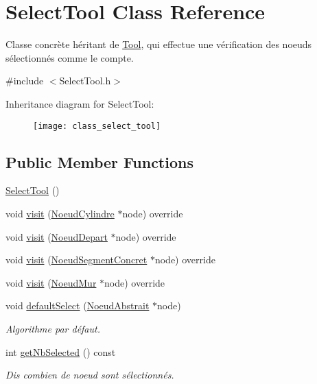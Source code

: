 \hypertarget{class_select_tool}{}\section{Select\+Tool Class Reference}
\label{class_select_tool}


Classe concrète héritant de \hyperlink{class_tool}{Tool}, qui effectue une vérification des noeuds sélectionnés comme le compte.  




{\ttfamily \#include $<$Select\+Tool.\+h$>$}

Inheritance diagram for Select\+Tool\+:\begin{figure}[H]
\begin{center}
\leavevmode
\texttt{[image: class\_select\_tool]}
\end{center}
\end{figure}
\subsection*{Public Member Functions}
\begin{DoxyCompactItemize}
\item 
\hyperlink{group__inf2990_ga2174af55e744036f0ccc5ce1fe25ddb1}{Select\+Tool} ()
\item 
void \hyperlink{group__inf2990_gacd9fee116b738725ab0f664029253fa0}{visit} (\hyperlink{class_noeud_cylindre}{Noeud\+Cylindre} $\ast$node) override
\item 
void \hyperlink{group__inf2990_ga392f7eb2a74106cff675878f5453a9d3}{visit} (\hyperlink{class_noeud_depart}{Noeud\+Depart} $\ast$node) override
\item 
void \hyperlink{group__inf2990_ga3e4db43bef245d0d88d49f018fee424f}{visit} (\hyperlink{class_noeud_segment_concret}{Noeud\+Segment\+Concret} $\ast$node) override
\item 
void \hyperlink{group__inf2990_gab6a7d46d8fad7c1045678b6dec3c9400}{visit} (\hyperlink{class_noeud_mur}{Noeud\+Mur} $\ast$node) override
\item 
void \hyperlink{group__inf2990_ga01b8ec1322baa74ee48e5087337bc959}{default\+Select} (\hyperlink{class_noeud_abstrait}{Noeud\+Abstrait} $\ast$node)
\begin{DoxyCompactList}\small\item\em Algorithme par défaut. \end{DoxyCompactList}\item 
int \hyperlink{group__inf2990_gaca4f60cc972b5d9df612f48c18c8364a}{get\+Nb\+Selected} () const 
\begin{DoxyCompactList}\small\item\em Dis combien de noeud sont sélectionnés. \end{DoxyCompactList}\end{DoxyCompactItemize}


